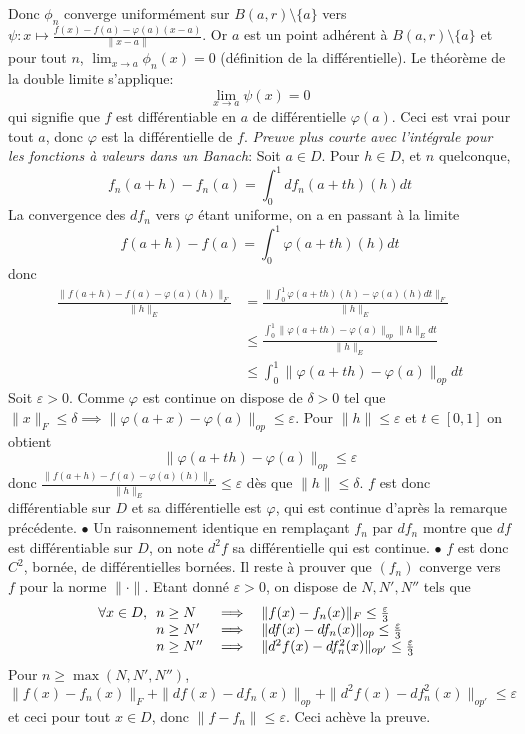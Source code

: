\documentclass{report}
\begin{document}
Donc $\phi_n$ converge uniformément sur $B(a,r)\setminus \{a\}$ vers $\psi: x\mapsto \frac{f(x)-f(a)-\varphi(a)(x-a)}{\|x-a\|}$.\newline
Or $a$ est un point adhérent à $B(a,r)\setminus \{a\}$ et pour tout $n$, $\displaystyle \lim_{x\to a}\phi_n(x) = 0$ (définition de la différentielle).
Le théorème de la double limite s'applique: $$\lim_{x\to a} \psi(x) = 0$$
qui signifie que $f$ est différentiable en $a$ de différentielle $\varphi(a)$. Ceci est vrai pour tout $a$, donc $\varphi$ est la différentielle de $f$.
\newline
\newline
\textit{Preuve plus courte avec l'intégrale pour les fonctions à valeurs dans un Banach}:
Soit $a\in D$. Pour $h\in D$, et $n$ quelconque, $$f_n(a+h)-f_n(a)=\int_0^1 df_n(a+th)(h)dt$$
La convergence des $df_n$ vers $\varphi$ étant uniforme, on a en passant à la limite $$f(a+h)-f(a) = \int_0^1 \varphi(a+th)(h) dt$$
donc $$\begin{aligned} \frac{\|f(a+h)-f(a)-\varphi(a)(h)\|_F}{\|h\|_E}&=\frac{\|\int_0^1 \varphi(a+th)(h)-  \varphi(a)(h) dt\|_F}{\|h\|_E} \\
&\leq \frac{\int_0^1 \|\varphi(a+th)-\varphi(a)\|_{op}\|h\|_E dt}{\|h\|_E}\\
&\leq \int_0^1 \|\varphi(a+th)-\varphi(a)\|_{op} dt \end{aligned}$$
Soit $\varepsilon>0$. Comme $\varphi$ est continue on dispose de $\delta >0$ tel que $\|x\|_F \leq \delta \implies \|\varphi(a+x)-\varphi(a)\|_{op} \leq \varepsilon$. Pour $\|h\| \leq \varepsilon$ et $t\in [0,1]$ on obtient $$\|\varphi(a+th)-\varphi(a)\|_{op}\leq \varepsilon$$ donc $\displaystyle \frac{\|f(a+h)-f(a)-\varphi(a)(h)\|_F}{\|h\|_E}\leq \varepsilon$ dès que $\|h\| \leq \delta$.\newline
$f$ est donc différentiable sur $D$ et sa différentielle est $\varphi$, qui est continue d'après la remarque précédente.\newline
$\bullet$ Un raisonnement identique en remplaçant $f_n$ par $df_n$ montre que $df$ est différentiable sur $D$, on note $d^2f$ sa différentielle qui est continue.\newline
$\bullet$ $f$ est donc $C^2$, bornée, de différentielles bornées. Il reste à prouver que $(f_n)$ converge vers $f$ pour la norme $\|\cdot\|$.\newline
Etant donné $\varepsilon >0$, on dispose de $N,N',N''$ tels que $$ 
\forall x\in D, \begin{array}[t]{lcl} n\geq N &\implies &\|f(x) -f_n(x)\|_F \leq \frac{\varepsilon}3 \\
n\geq N' &\implies &\|df(x) -df_n(x)\|_{op} \leq \frac{\varepsilon}3 \\
n\geq N'' &\implies &\|d^2f(x) -df^2_n(x)\|_{op'} \leq \frac{\varepsilon}3
\end{array}$$
Pour $n\geq \max(N,N',N'')$, $$\|f(x) -f_n(x)\|_F+\|df(x) -df_n(x)\|_{op}+\|d^2f(x) -df^2_n(x)\|_{op'}\leq \varepsilon$$ et ceci pour tout $x\in D$, donc $\|f-f_n\|\leq \varepsilon$. Ceci achève la preuve.
\end{document}
